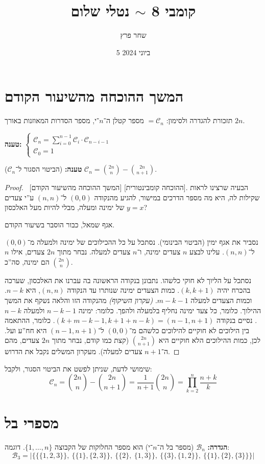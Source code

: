\documentclass[]{article}
\author{שחר פרץ}
\title{קומבי 8 $\sim$ נטלי שלום }
\date{5 ביוני 2024}
\newcommand\bc    {\mathcal{B}}
\newcommand\cc    {\mathcal{C}}
\begin{document}
	\maketitle
	\section{המשך ההוכחה מהשיעור הקודם}
	תזכורת להגדרה ולסימון: $=\cc_n$ מספר קטלן ה־$n$־י, מספר הסדרות המאוזנות באורך $2n$. 
	
	\textbf{טענה: }$\begin{cases}
		\cc_n = \sum_{i = 0}^{n - 1}\cc_i \cdot \cc_{n - i - 1}\\
		\cc_0 = 1
	\end{cases}$
	
	\textbf{טענה: }(הביטוי הסגור ל־$\cc_n$) $\cc_n = \binom{2n}{n} - \binom{2n}{n + 1}$. 
	
	\begin{proof}
		\ [המשך ההוכחה מהשיעור הקודם] [ההוכחה קומבינטורית]. הבעיה שרצינו לראות שקילות לה, היא מה מספר הדרכים במישור, להגיע מהנקודה $(0, 0)$ ל־$(n, n)$ ע''י צעדים של ימינה ומעלה, מבלי להיות מעל האלכסון $y = x$?
		
		אגף שמאל, כבור הוסבר בשיעור הקודם. 
		
		נסביר את אגף ימין (הביטוי הבינומי). נסתכל על כל ההכילוכים של ימינה ולמעלה מ־$(0, 0)$ ל־$(n, n)$. עלינו לבצע $n$ צעדים ימינה, ו־$n$ צעדים למעלה. נבחר מתוך $2n$ צעדים, אילו $n$ הם ימינה, סה''כ $\binom{2n}{n}$. 
		
		נסתכל על הליוך לא חוקי כלשהו. נתבונן בנקודה הראשונה בה עברנו את האלכסון, שערכה בהכרח יהיה $(k, k + 1)$. כמות הצעדים ימינה שנותרו עד הנקודה $(n, n)$, היא $n - k$. וכמות הצעדים למעלה $m - k - 1 $. \textit{(עקרון השיקוף)} מהנקודה הזו והלאה נשקף את המשך ההילוך. כלומר, כל צעד ימינה נחליף בלמעלה ולהפך. כלומר: ימינה $n - k - 1 $ ולמעלה $n - k $. נסיים בנקודה $(k + m - k - 1, k + 1 + n - k) = (n - 1, n + 1)$. כלומר, ההתאמה בין הילוכים לא חוקיים להילוכים כלשהם מ־$(0, 0)$ ל־$(n - 1, n + 1)$ היא חח''ע ועל. לכן, כמות ההילוכים הלא חוקיים היא $\binom{2n}{n + 1}$ (קצת כמו קודם, נבחר מתוך $2n$ צעדים, מהם ה־$n + 1$ צעדים למעלה). מעקרון המשלים נקבל את הדרוש. 
	\end{proof}
	
	שימושי לדעת, שניתן לפשט את הביטוי הסגור, ולקבל: 
	\[ \cc_n = \binom{2n}{n} - \binom{2n}{n + 1} = \frac{1}{n + 1} \binom{2n}{n} = \prod_{k = 2}^{n}\frac{n + k}{k} \]
	
	\section{מספרי בל}
	\textbf{הגדרה: }$\bc_n$ (מספר בל ה־$n$־י) הוא מספר החלוקות של הקבוצה $\{1, \dots, n\}$. דוגמה: 
	\[ \bc_3 = |\{\{\{1, 2, 3\}\}, \ \{\{1\}, \{2, 3\}\}, \ \{\{2\}, \ \{1, 3\}\}, \ \{\{3\}, \{1, 2\}\}, \ \{\{1\}, \{2\}, \{3\}\}\}| \]
	
\end{document}
